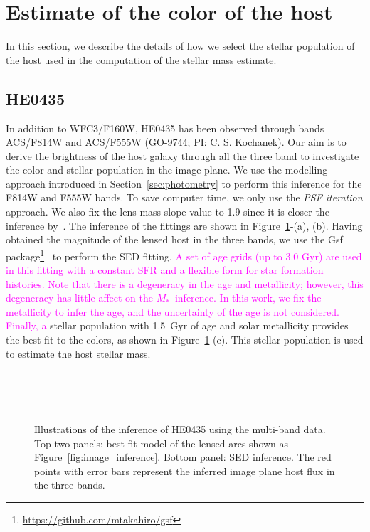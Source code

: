 \documentclass[fleqn,usenatbib]{mnras}
\newcommand{\mstar}{{$M_*$}}
\newcommand{\pink}[1]{{\textcolor{magenta}{#1}}}
\begin{document}

\appendix

\section{Estimate of the color of the host}
In this section, we describe the details of how we select the stellar population of the host used in the computation of the stellar mass estimate.

\subsection{HE0435}\label{app:HE0435}
In addition to WFC3/F160W, HE0435 has been observed through bands ACS/F814W and ACS/F555W (GO-9744; PI: C. S. Kochanek). Our aim is to derive the brightness of the host galaxy through all the three band to investigate the color and stellar population in the image plane. We use the modelling approach introduced in Section~\ref{sec:photometry} to perform this inference for the F814W and F555W bands. To save computer time, we only use the {\it PSF iteration} approach. We also fix the lens mass slope value to 1.9 since it is closer the inference by~\citet[][i.e., $\gamma\sim1.93$]{Wong2017}. The inference of the fittings are shown in Figure~\ref{fig:app_HE0435}-(a), (b). Having obtained the magnitude of the lensed host in the three bands, we use the {\sc Gsf} package\footnote{\url{https://github.com/mtakahiro/gsf}}~\citep{Morishita2019} to perform the SED fitting. \pink{A set of age grids (up to 3.0 Gyr) are used in this fitting with a constant SFR and a flexible form for star formation histories. Note that there is a degeneracy in the age and metallicity; however, this degeneracy has little affect on the \mstar\ inference. In this work, we fix the metallicity to infer the age, and the uncertainty of the age is not considered. Finally, a} stellar population with 1.5~Gyr of age and solar metallicity provides the best fit to the colors, as shown in Figure~\ref{fig:app_HE0435}-(c). This stellar population is used to estimate the host stellar mass.


\begin{figure}
\centering
{}\\
\\
\\
\caption{\label{fig:app_HE0435} 
Illustrations of the inference of HE0435 using the multi-band data. Top two panels: best-fit model of the lensed arcs shown as Figure~\ref{fig:image_inference}. Bottom panel: SED inference. The red points with error bars represent the inferred image plane host flux in the three bands.}
\end{figure} 
\end{document}
